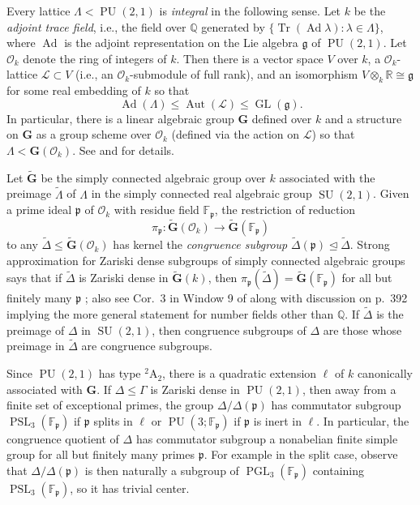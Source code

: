 \documentclass[11pt]{article}
\theoremstyle{plain}
\theoremstyle{definition}
\theoremstyle{remark}
\newcommand{\bbF}{\mathbb{F}}
\newcommand{\bbQ}{\mathbb{Q}}
\newcommand{\bbR}{\mathbb{R}}
\newcommand{\bfG}{\mathbf{G}}
\newcommand{\calL}{\mathcal{L}}
\newcommand{\calO}{\mathcal{O}}
\newcommand{\frakg}{\mathfrak{g}}
\newcommand{\frakp}{\mathfrak{p}}
\newcommand{\Gam}{\Gamma}
\newcommand{\Del}{\Delta}
\newcommand{\lam}{\lambda}
\newcommand{\Lam}{\Lambda}
\DeclareMathOperator{\PSL}{PSL}
\DeclareMathOperator{\GL}{GL}
\DeclareMathOperator{\PGL}{PGL}
\DeclareMathOperator{\PU}{PU}
\DeclareMathOperator{\SU}{SU}
\DeclareMathOperator{\Ad}{Ad}
\DeclareMathOperator{\Tr}{Tr}
\DeclareMathOperator{\Aut}{Aut}
\newcommand{\lra}{\longrightarrow}
\newcommand{\wt}{\widetilde}
\begin{document}
Every lattice $\Lam < \PU(2,1)$ is \emph{integral} in the following sense. Let $k$ be the \emph{adjoint trace field}, i.e., the field over $\bbQ$ generated by $\{\Tr(\Ad \lam) : \lam \in \Lam\}$, where $\Ad$ is the adjoint representation on the Lie algebra $\frakg$ of $\PU(2,1)$. Let $\calO_k$ denote the ring of integers of $k$. Then there is a vector space $V$ over $k$, a $\calO_k$-lattice $\calL \subset V$ (i.e., an $\calO_k$-submodule of full rank), and an isomorphism $V \otimes_k \bbR \cong \frakg$ for some real embedding of $k$ so that
\begin{equation}\label{eq:Integral}
\Ad(\Lam) \le \Aut(\calL) \le \GL(\frakg).
\end{equation}
In particular, there is a linear algebraic group $\bfG$ defined over $k$ and a structure on $\bfG$ as a group scheme over $\calO_k$ (defined via the action on $\calL$) so that $\Lam < \bfG(\calO_k)$. See \cite[Thm.\ 1.5]{BFMS2} and \cite[Thm.\ 1 \& 3]{Vinberg} for details.

Let $\wt{\bfG}$ be the simply connected algebraic group over $k$ associated with the preimage $\wt{\Lam}$ of $\Lam$ in the simply connected real algebraic group $\SU(2,1)$. Given a prime ideal $\frakp$ of $\calO_k$ with residue field $\bbF_\frakp$, the restriction of reduction
\begin{equation}\label{eq:ReductionModp}
\pi_\frakp : \wt{\bfG}(\calO_k) \lra \wt{\bfG}(\bbF_\frakp)
\end{equation}
to any $\wt{\Del} \le \wt{\bfG}(\calO_k)$ has kernel the \emph{congruence subgroup} $\wt{\Del}(\frakp) \trianglelefteq \wt{\Del}$. Strong approximation for Zariski dense subgroups of simply connected algebraic groups says that if $\wt{\Del}$ is Zariski dense in $\wt{\bfG}(k)$, then $\pi_\frakp(\wt{\Del}) = \wt{\bfG}(\bbF_\frakp)$ for all but finitely many $\frakp$ \cite[Thm.\ 1.1]{Weisfeiler}; also see Cor.\ 3 in Window 9 of \cite{LubotzkySegal} along with discussion on p.\ 392 implying the more general statement for number fields other than $\bbQ$. If $\wt{\Del}$ is the preimage of $\Del$ in $\SU(2,1)$, then congruence subgroups of $\Del$ are those whose preimage in $\wt{\Del}$ are congruence subgroups.

Since $\PU(2,1)$ has type ${}^2 \mathrm{A}_2$, there is a quadratic extension $\ell$ of $k$ canonically associated with $\bfG$. If $\Del \le \Gam$ is Zariski dense in $\PU(2,1)$, then away from a finite set of exceptional primes, the group $\Del / \Del(\frakp)$ has commutator subgroup $\PSL_3(\bbF_\frakp)$ if $\frakp$ splits in $\ell$ or $\PU(3; \bbF_\frakp)$ if $\frakp$ is inert in $\ell$. In particular, the congruence quotient of $\Del$ has commutator subgroup a nonabelian finite simple group for all but finitely many primes $\frakp$. For example in the split case, observe that $\Del / \Del(\frakp)$ is then naturally a subgroup of $\PGL_3(\bbF_\frakp)$ containing $\PSL_3(\bbF_\frakp)$, so it has trivial center.
\end{document}
